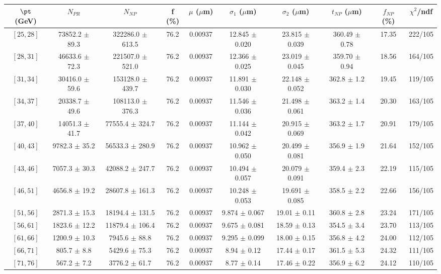\begin{tabular}{c||c|c|c|c|c|c|c||c|c}
$\pt$ (GeV) & $N_{PR}$ & $N_{NP}$ & f (\%) & $\mu$ ($\mu$m) & $\sigma_1$ ($\mu$m) & $\sigma_2$ ($\mu$m)  & $t_{NP}$ ($\mu$m) & $f_{NP}$ (\%) & $\chi^2$/ndf \\
\hline
$[25, 28]$ & 73852.2 $\pm$ 89.3 & 322286.0 $\pm$ 613.5 & 76.2 & 0.00937 & 12.845 $\pm$ 0.020 & 23.815 $\pm$ 0.039 & 360.49 $\pm$ 0.78 & 17.35 & 222/105\\
$[28, 31]$ & 46633.6 $\pm$ 72.3 & 221507.0 $\pm$ 521.0 & 76.2 & 0.00937 & 12.366 $\pm$ 0.025 & 23.019 $\pm$ 0.045 & 359.70 $\pm$ 0.94 & 18.56 & 164/105\\
$[31, 34]$ & 30416.0 $\pm$ 59.6 & 153128.0 $\pm$ 439.7 & 76.2 & 0.00937 & 11.891 $\pm$ 0.030 & 22.148 $\pm$ 0.052 & 362.8 $\pm$ 1.2 & 19.45 & 119/105\\
$[34, 37]$ & 20338.7 $\pm$ 49.6 & 108113.0 $\pm$ 376.3 & 76.2 & 0.00937 & 11.546 $\pm$ 0.036 & 21.498 $\pm$ 0.061 & 363.2 $\pm$ 1.4 & 20.30 & 163/105\\
$[37, 40]$ & 14051.3 $\pm$ 41.7 & 77555.4 $\pm$ 324.7 & 76.2 & 0.00937 & 11.144 $\pm$ 0.042 & 20.915 $\pm$ 0.069 & 363.2 $\pm$ 1.7 & 20.91 & 179/105\\
$[40, 43]$ & 9782.3 $\pm$ 35.2 & 56533.3 $\pm$ 280.9 & 76.2 & 0.00937 & 10.962 $\pm$ 0.050 & 20.499 $\pm$ 0.081 & 356.9 $\pm$ 1.9 & 21.64 & 152/105\\
$[43, 46]$ & 7057.3 $\pm$ 30.3 & 42088.2 $\pm$ 247.7 & 76.2 & 0.00937 & 10.494 $\pm$ 0.057 & 20.079 $\pm$ 0.091 & 359.4 $\pm$ 2.3 & 22.19 & 115/105\\
$[46, 51]$ & 4656.8 $\pm$ 19.2 & 28607.8 $\pm$ 161.3 & 76.2 & 0.00937 & 10.248 $\pm$ 0.053 & 19.691 $\pm$ 0.085 & 358.5 $\pm$ 2.2 & 22.66 & 156/105\\
$[51, 56]$ & 2871.3 $\pm$ 15.3 & 18194.4 $\pm$ 131.5 & 76.2 & 0.00937 & 9.874 $\pm$ 0.067 & 19.01 $\pm$ 0.11 & 360.8 $\pm$ 2.8 & 23.24 & 171/105\\
$[56, 61]$ & 1823.6 $\pm$ 12.2 & 11879.4 $\pm$ 106.4 & 76.2 & 0.00937 & 9.675 $\pm$ 0.081 & 18.59 $\pm$ 0.13 & 354.5 $\pm$ 3.4 & 23.70 & 113/105\\
$[61, 66]$ & 1200.9 $\pm$ 10.3 & 7945.6 $\pm$ 88.8 & 76.2 & 0.00937 & 9.295 $\pm$ 0.099 & 18.00 $\pm$ 0.15 & 356.8 $\pm$ 4.2 & 24.00 & 112/105\\
$[66, 71]$ & 805.7 $\pm$ 8.8 & 5429.6 $\pm$ 75.3 & 76.2 & 0.00937 & 8.94 $\pm$ 0.12 & 17.44 $\pm$ 0.17 & 361.5 $\pm$ 5.3 & 24.32 & 111/105\\
$[71, 76]$ & 567.2 $\pm$ 7.2 & 3776.2 $\pm$ 61.7 & 76.2 & 0.00937 & 8.77 $\pm$ 0.14 & 17.46 $\pm$ 0.22 & 356.9 $\pm$ 6.2 & 24.12 & 110/105\\

\end{tabular}

